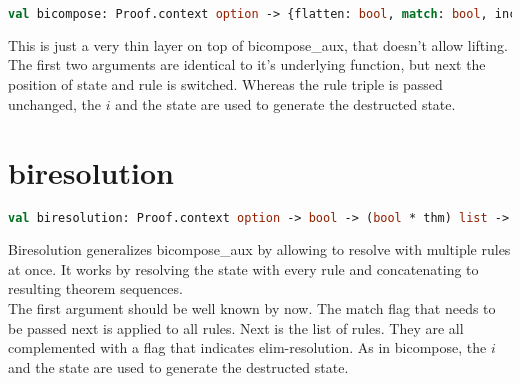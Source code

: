 \begin{lstlisting}[language=ML,breaklines=true]
val bicompose: Proof.context option -> {flatten: bool, match: bool, incremented: bool} -> bool * thm * int -> int -> thm -> thm Seq.seq
\end{lstlisting}

This is just a very thin layer on top of bicompose\_aux, that doesn't allow lifting. The first two arguments are identical to it's underlying function, but next the position of state and rule is switched. Whereas the rule triple is passed unchanged, the $i$ and the state are used to generate the destructed state.\\

\section{biresolution}

\begin{lstlisting}[language=ML,breaklines=true]
val biresolution: Proof.context option -> bool -> (bool * thm) list -> int -> thm -> thm Seq.seq
\end{lstlisting}

Biresolution generalizes bicompose\_aux by allowing to resolve with multiple rules at once. It works by resolving the state with every rule and concatenating to resulting theorem sequences.\\
The first argument should be well known by now. The match flag that needs to be passed next is applied to all rules. Next is the list of rules. They are all complemented with a flag that indicates elim-resolution. As in bicompose, the $i$ and the state are used to generate the destructed state.